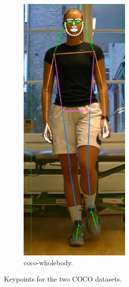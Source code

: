 \begin{figure}
\begin{subfigure}[t]{0.45\textwidth}
  \includegraphics[width=0.6\textwidth]{files/figs/hpe/coco-wholebody.png}
  \caption{\gls{coco}-wholebody.}
  \label{fig:coco-wholebody}
 \end{subfigure}
 \caption{Keypoints for the two COCO datasets.}
\end{figure}

